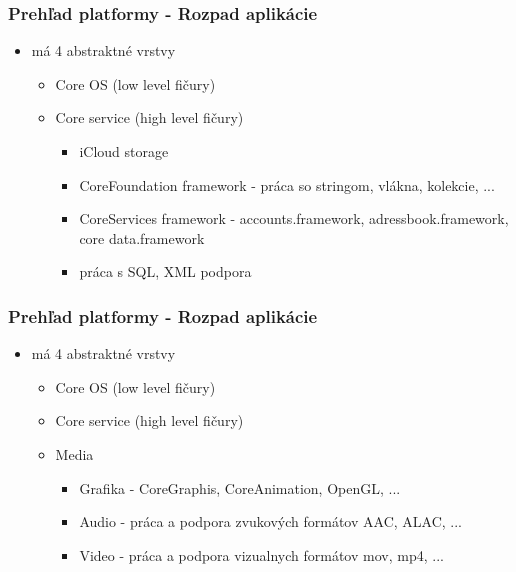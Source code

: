 \documentclass[serif,mathserif]{beamer}
\begin{document}
\begin{frame}
  \frametitle{Prehľad platformy - Rozpad aplikácie}
  \begin{itemize}
	\item má 4 abstraktné vrstvy
	\begin{itemize}
	\item Core OS (low level fičury)
	\item Core service (high level fičury)\pause
	\begin{itemize}
	\item iCloud storage\pause
	\item CoreFoundation framework - práca so stringom, vlákna, kolekcie, ...\pause
	\item CoreServices framework - accounts.framework, adressbook.framework, core data.framework\pause 
	\item práca s SQL, XML podpora
  \end{itemize}
  \end{itemize}
  \end{itemize}
\end{frame}

\begin{frame}
  \frametitle{Prehľad platformy - Rozpad aplikácie}
  \begin{itemize}
	\item má 4 abstraktné vrstvy
	\begin{itemize}
	\item Core OS (low level fičury)
	\item Core service (high level fičury)
	\item Media\pause
	\begin{itemize}
	\item Grafika - CoreGraphis, CoreAnimation, OpenGL, ...\pause
	\item Audio - práca a podpora zvukových formátov AAC, ALAC, ...\pause 
	\item Video - práca a podpora vizualnych formátov mov, mp4, ...
  \end{itemize}
  \end{itemize}
  \end{itemize}
\end{frame}
\end{document}
